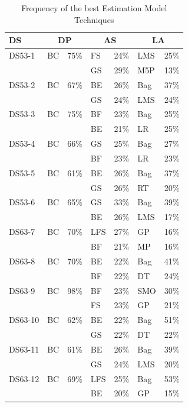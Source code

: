 \documentclass[conference]{IEEEtran}
\begin{document}
\begin{table}
\centering
\caption{Frequency of the best Estimation Model Techniques}
\label{TableModels}
\begin{tabular}{|l|l|l|l|l|l|l|}\hline
\textbf{DS} & \multicolumn{2}{c}{\textbf{DP}} & \multicolumn{2}{c}{\textbf{AS}} & \multicolumn{2}{c}{\textbf{LA}} \\\hline
DS53-1  & BC & 75\% & FS  & 24\% & LMS & 25\% \\
        &    &      & GS  & 29\% & M5P & 13\% \\\hline
DS53-2  & BC & 67\% & BE  & 26\% & Bag & 37\% \\
        &    &      & GS  & 24\% & LMS & 24\% \\\hline
DS53-3  & BC & 75\% & BF  & 23\% & Bag & 25\% \\
        &    &      & BE  & 21\% & LR  & 25\% \\\hline
DS53-4  & BC & 66\% & GS  & 25\% & Bag & 27\% \\
        &    &      & BF  & 23\% & LR  & 23\% \\\hline
DS53-5  & BC & 61\% & BE  & 26\% & Bag & 37\% \\
        &    &      & GS  & 26\% & RT  & 20\% \\\hline
DS53-6  & BC & 65\% & GS  & 33\% & Bag & 39\% \\
        &    &      & BE  & 26\% & LMS & 17\% \\\hline
DS63-7  & BC & 70\% & LFS & 27\% & GP  & 16\% \\
        &    &      & BF  & 21\% & MP  & 16\% \\\hline
DS63-8  & BC & 70\% & BE  & 22\% & Bag & 41\% \\
        &    &      & BF  & 22\% & DT  & 24\% \\\hline
DS63-9  & BC & 98\% & BF  & 23\% & SMO & 30\% \\
        &    &      & FS  & 23\% & GP  & 21\% \\\hline
DS63-10 & BC & 62\% & BE  & 22\% & Bag & 51\% \\
        &    &      & GS  & 22\% & DT  & 22\% \\\hline
DS63-11 & BC & 61\% & BE  & 26\% & Bag & 39\% \\
        &    &      & GS  & 24\% & LMS & 20\% \\\hline
DS63-12 & BC & 69\% & LFS & 25\% & Bag & 53\% \\
        &    &      & BE  & 20\% & GP  & 15\%\\\hline 
\end{tabular}
\end{table}
\end{document}
